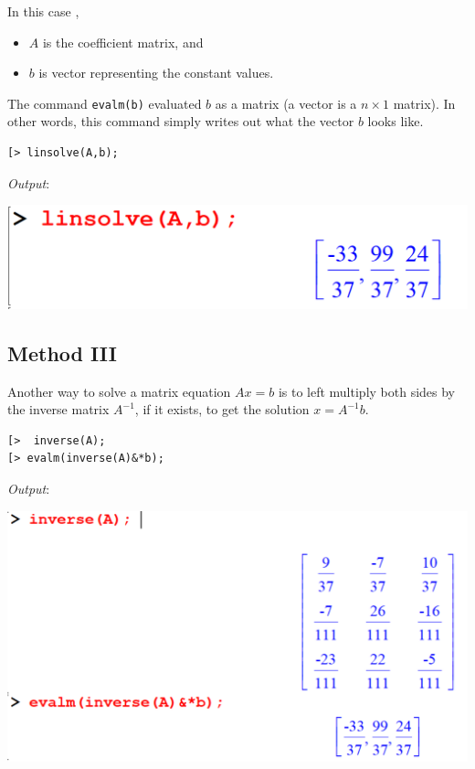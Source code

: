 \documentclass[
]{book}
\providecommand{\tightlist}{%
  \setlength{\itemsep}{0pt}\setlength{\parskip}{0pt}}
\theoremstyle{definition}
\theoremstyle{definition}
\theoremstyle{definition}
\theoremstyle{definition}
\theoremstyle{remark}
\begin{document}
In this case ,

\begin{itemize}
\tightlist
\item
  \(A\) is the coefficient matrix, and
\item
  \(b\) is vector representing the constant values.
\end{itemize}

The command \texttt{evalm(b)} evaluated \(b\) as a matrix (a vector is a \(n \times 1\) matrix).
In other words, this command simply writes out what the vector \(b\) looks like.

\begin{verbatim}
[> linsolve(A,b);
\end{verbatim}

\emph{Output}:

\includegraphics{figures/Lesson 5/fig7.png}

\subsection{Method III}\label{method-iii}

Another way to solve a matrix equation \(Ax = b\) is to left multiply both sides by the inverse matrix \(A^{-1}\), if it exists, to get the solution \(x = A^{-1}b\).

\begin{verbatim}
[>  inverse(A);
[> evalm(inverse(A)&*b);
\end{verbatim}

\emph{Output}:

\includegraphics{figures/Lesson 5/fig8.png}
\end{document}
